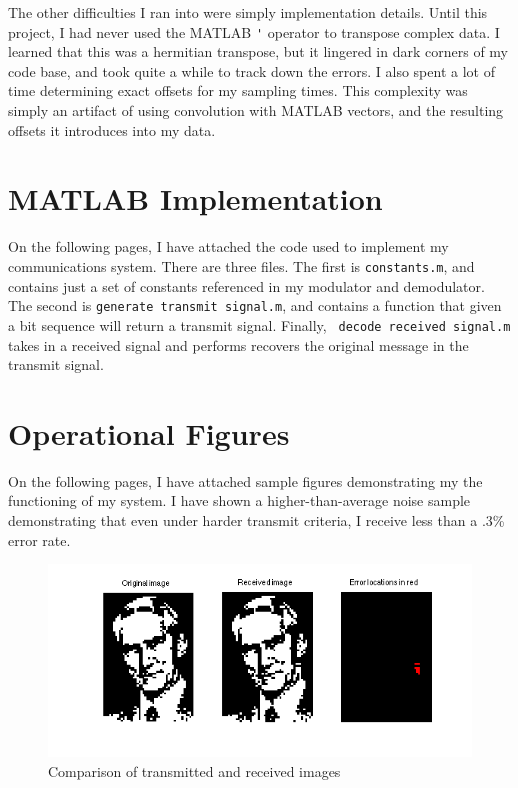 \documentclass[11pt]{scrartcl}
\begin{document}
The other difficulties I ran into were simply implementation details. Until this
project, I had never used the MATLAB \verb|'| operator to transpose complex
data.  I learned that this was a hermitian transpose, but it lingered in dark
corners of my code base, and took quite a while to track down the errors. I also
spent a lot of time determining exact offsets for my sampling times. This
complexity was simply an artifact of using convolution with MATLAB vectors, and
the resulting offsets it introduces into my data.



\section*{MATLAB Implementation}

On the following pages, I have attached the code used to implement my
communications system. There are three files. The first is {\tt constants.m},
and contains just a set of constants referenced in my modulator and demodulator.
The second is {\tt generate transmit signal.m}, and contains a function that
given a bit sequence will return a transmit signal. Finally, {\tt
decode received signal.m} takes in a received signal and performs recovers the
original message in the transmit signal.

\pagebreak


\pagebreak


\pagebreak




\pagebreak
\section*{Operational Figures}

On the following pages, I have attached sample figures demonstrating my the
functioning of my system. I have shown a higher-than-average noise sample
demonstrating that even under harder transmit criteria, I receive less than
a .3\% error rate.

\begin{figure}[h]
    \centering
    \includegraphics[width=1.0\textwidth]{figures/receivedimage.png}
    \caption{Comparison of transmitted and received images}
\end{figure}
\end{document}
